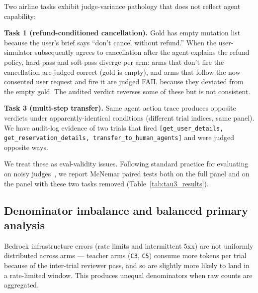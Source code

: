 Two airline tasks exhibit judge-variance pathology that does not reflect agent capability:

\textbf{Task 1 (refund-conditioned cancellation).} Gold has empty mutation list because the user's brief says ``don't cancel without refund.'' When the user-simulator subsequently agrees to cancellation after the agent explains the refund policy, hard-pass and soft-pass diverge per arm: arms that don't fire the cancellation are judged correct (gold is empty), and arms that follow the now-consented user request and fire it are judged FAIL because they deviated from the empty gold. The audited verdict reverses some of these but is not consistent.

\textbf{Task 3 (multi-step transfer).} Same agent action trace produces opposite verdicts under apparently-identical conditions (different trial indices, same panel). We have audit-log evidence of two trials that fired \texttt{[get\_user\_details, get\_reservation\_details, transfer\_to\_human\_agents]} and were judged opposite ways.

We treat these as eval-validity issues. Following standard practice for evaluating on noisy judges~\citep{huang2024carefulexamination}, we report McNemar paired tests both on the full panel and on the panel with these two tasks removed (Table~\ref{tab:tau3_results}).

\subsection{Denominator imbalance and balanced primary analysis}

Bedrock infrastructure errors (rate limits and intermittent 5xx) are not uniformly distributed across arms — teacher arms (\texttt{C3}, \texttt{C5}) consume more tokens per trial because of the inter-trial reviewer pass, and so are slightly more likely to land in a rate-limited window. This produces unequal denominators when raw counts are aggregated.

